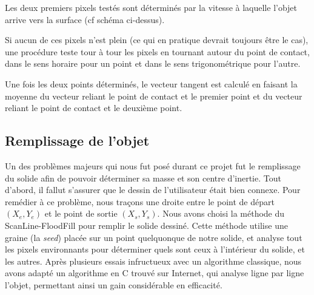 Les deux premiers pixels testés sont déterminés par la vitesse à laquelle
l'objet arrive vers la surface (cf schéma ci-dessus).

Si aucun de ces pixels n'est plein (ce qui en pratique devrait toujours être le cas),
une procédure teste tour à tour les pixels en tournant autour du point de contact,
dans le sens horaire pour un point et dans le sens trigonométrique pour l'autre.

Une fois les deux points déterminés, le vecteur tangent est calculé en
faisant la moyenne du vecteur reliant le point de contact et le premier point
et du vecteur reliant le point de contact et le deuxième point.



\subsection{Remplissage de l'objet}
Un des problèmes majeurs qui nous fut posé durant ce projet fut le remplissage
du solide afin de pouvoir déterminer sa masse et son centre d'inertie.
Tout d'abord, il fallut s'assurer que le dessin de l'utilisateur était bien connexe.
Pour remédier à ce problème, nous traçons une droite entre le point de départ
$(X_e,Y_e)$ et le point de sortie $(X_s,Y_s)$.
Nous avons choisi la méthode du ScanLine-FloodFill pour remplir le solide dessiné.
Cette méthode utilise une graine (la \emph{seed}) placée sur un point quelquonque
de notre solide, et analyse tout les pixels environnants pour déterminer
quels sont ceux à l'intérieur du solide, et les autres.
Après plusieurs essais infructueux avec un algorithme classique, nous avons
adapté un algorithme en C trouvé sur Internet, qui analyse ligne par ligne l'objet,
permettant ainsi un gain considérable en efficacité. 
%

